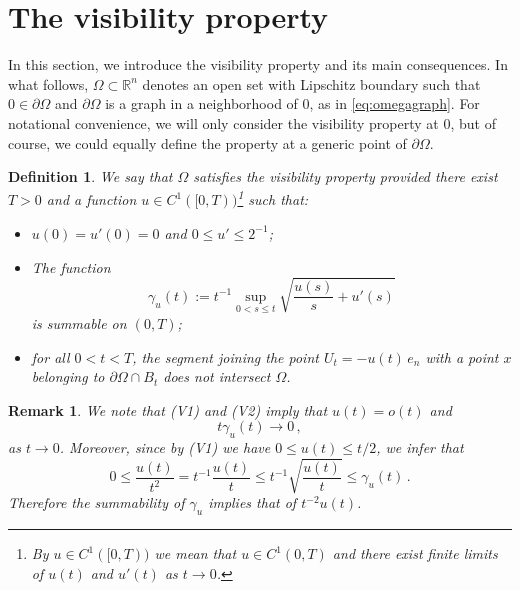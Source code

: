\documentclass[a4paper,reqno,11pt]{amsart}
\newtheorem{definition}[theorem]{Definition}
\newtheorem{remark}[theorem]{Remark}
\newcommand{\R}{\mathbb{R}}
\newcommand{\de}{\partial}
\begin{document}
\section{The visibility property}
\label{sec:visibility}
In this section, we introduce the visibility property and its main consequences. In what follows, $\Omega \subset \R^n$ denotes an open set with Lipschitz boundary such that $0 \in \de \Omega$ and $\de \Omega$ is a graph in a neighborhood of $0$, as in \eqref{eq:omegagraph}. For notational convenience, we will only consider the visibility property at $0$, but of course, we could equally define the property at a generic point of $\de \Omega$. 
\begin{definition} \label{def:visib}
We say that $\Omega$ satisfies the \textit{visibility property} provided there exist $T>0$ and a function $u \in C^1([0,T))$\footnote{By $u\in C^{1}([0,T))$ we mean that $u\in C^{1}(0,T)$ and there exist finite limits of $u(t)$ and $u'(t)$ as $t\to 0$.} such that:
\begin{itemize}
\item[(V1)] $u(0)=u'(0)=0$ and $0\le u' \le 2^{-1}$;
\item[(V2)] The function
\[
\gamma_{u}(t) := t^{-1}\sup_{0<s\le t} \sqrt{\frac{u(s)}{s}+u'(s)}
\]
is summable on $(0,T)$;
\item[(V3)] for all $0 < t < T$, the segment joining the point $U_t = -u(t) \, e_{n}$ with a point $x$ belonging to $\de \Omega \cap B_{t}$ does not intersect $\Omega$.
\end{itemize}
\end{definition}
\begin{remark}\label{rem:V2strong}
We note that (V1) and (V2) imply that $u(t) = o(t)$ and 
\begin{equation}\label{eq:tgammazero}
t\gamma_{u}(t)\to 0\,,
\end{equation}
as $t\to 0$. Moreover, since by (V1) we have $0\le u(t) \le t/2$, we infer that
\begin{equation*}%
0\le\frac{u(t)}{t^{2}} = t^{-1}\frac{u(t)}{t} \le t^{-1}\sqrt{\frac{u(t)}{t}} \le \gamma_{u}(t)\,.
\end{equation*}
Therefore the summability of $\gamma_u$ implies that of $t^{-2} u(t)$.
\end{remark}
\end{document}
